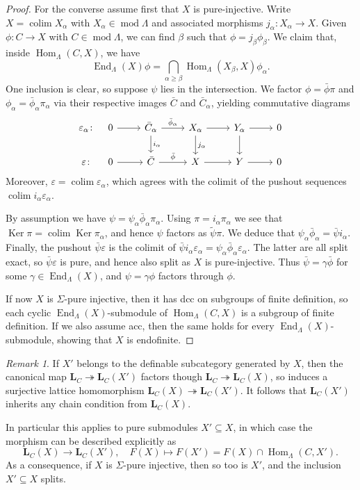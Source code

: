 \documentclass[a4paper]{amsart}
\theoremstyle{plain}
\theoremstyle{definition}
\theoremstyle{remark}
\newtheorem{rem}[thm]{Remark}
\numberwithin{equation}{section}
\newcommand{\colim}{\operatorname*{colim}}
\newcommand{\End}{\operatorname{End}}
\newcommand{\Hom}{\operatorname{Hom}}
\newcommand{\Ker}{\operatorname{Ker}}
\renewcommand{\mod}{\operatorname{mod}}
\def\bfL{\mathbf L}
\def\bfL{\mathbf L}
\begin{document}
\begin{proof}
For the converse assume first that $X$ is pure-injective. Write $X=\colim X_\alpha$ with $X_\alpha\in\mod\Lambda$ and associated morphisms $j_\alpha\colon X_\alpha\to X$. Given $\phi\colon C\to X$ with $C\in\mod\Lambda$, we can find $\beta$ such that $\phi=j_\beta\phi_\beta$. We claim that, inside $\Hom_\Lambda(C,X)$, we have
\[ \End_\Lambda(X)\phi = \bigcap_{\alpha\geq\beta}\Hom_\Lambda(X_\beta,X)\phi_\alpha. \]
One inclusion is clear, so suppose $\psi$ lies in the intersection. We factor $\phi=\bar\phi\pi$ and $\phi_\alpha=\bar\phi_\alpha\pi_\alpha$ via their respective images $\bar C$ and $\bar C_\alpha$, yielding commutative diagrams
\[ \begin{tikzcd}
\varepsilon_\alpha \colon &[-20pt] 0 \arrow[r] & \bar C_\alpha \arrow[r,"\bar\phi_\alpha"] \arrow[d,"i_\alpha"] &
X_\alpha \arrow[r] \arrow[d,"j_\alpha"] & Y_\alpha \arrow[r] \arrow[d] & 0\\
\varepsilon \colon &[-20pt] 0 \arrow[r] & \bar C \arrow[r,"\bar\phi"] & X \arrow[r] & Y \arrow[r] & 0
\end{tikzcd} \]
Moreover, $\varepsilon=\colim\varepsilon_\alpha$, which agrees with the colimit of the pushout sequences $\colim i_\alpha\varepsilon_\alpha$.

By assumption we have $\psi=\psi_\alpha\bar\phi_\alpha\pi_\alpha$. Using $\pi=i_\alpha\pi_\alpha$ we see that $\Ker\pi=\colim\Ker\pi_\alpha$, and hence $\psi$ factors as $\tilde\psi\pi$. We deduce that $\psi_\alpha\bar\phi_\alpha=\bar\psi i_\alpha$. Finally, the pushout $\bar\psi\varepsilon$ is the colimit of $\bar\psi i_\alpha\varepsilon_\alpha=\psi_\alpha\bar\phi_\alpha\varepsilon_\alpha$. The latter are all split exact, so $\bar\psi\varepsilon$ is pure, and hence also split as $X$ is pure-injective. Thus $\bar\psi=\gamma\bar\phi$ for some $\gamma\in\End_\Lambda(X)$, and $\psi=\gamma\phi$ factors through $\phi$.

If now $X$ is $\Sigma$-pure injective, then it has dcc on subgroups of finite definition, so each cyclic $\End_\Lambda(X)$-submodule of $\Hom_\Lambda(C,X)$ is a subgroup of finite definition. If we also assume acc, then the same holds for every $\End_\Lambda(X)$-submodule, showing that $X$ is endofinite.
\end{proof}

\begin{rem}\label{re:quot-lattice}
If $X'$ belongs to the definable subcategory generated by $X$, then the canonical map $\bfL_C\twoheadrightarrow\bfL_C(X')$ factors though $\bfL_C\twoheadrightarrow\bfL_C(X)$, so induces a surjective lattice homomorphism $\bfL_C(X)\twoheadrightarrow\bfL_C(X')$. It follows that $\bfL_C(X')$ inherits any chain condition from $\bfL_C(X)$.

In particular this applies to pure submodules $X'\subseteq X$, in which case the morphism can be described explicitly as
\[ \bfL_C(X) \to \bfL_C(X'), \quad F(X) \mapsto F(X')=F(X)\cap\Hom_\Lambda(C,X'). \]
As a consequence, if $X$ is $\Sigma$-pure injective, then so too is $X'$, and the inclusion $X'\subseteq X$ splits.
\end{rem}
\end{document}
